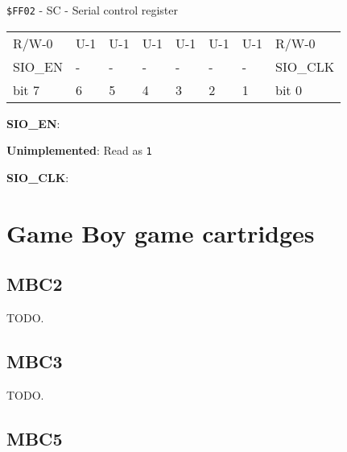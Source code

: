 \documentclass[a4paper, draft, oneside]{memoir}
\begin{document}
\begin{register}[H]
  \caption{\texttt{\$FF02} - SC - Serial control register}
  {
    \ttfamily
    \begin{tabu} to \textwidth {|X[c]|X[c]|X[c]|X[c]|X[c]|X[c]|X[c]|X[c]|}
      \everyrow{\hline}
      \hline
      R/W-0  & U-1                     & U-1                     & U-1                     & U-1                     & U-1                     & U-1                     & R/W-0   \\
      SIO\_EN &  - &  - &  - &  - &  - &  - & SIO\_CLK \\
      \rowfont{\rmfamily\small}
      bit 7  & 6                       & 5                       & 4                       & 3                       & 2                       & 1                       & bit 0   \\
      \hline
    \end{tabu}
  }

  \begin{description}[leftmargin=5em, style=nextline]
    \item[bit 7]
      \textbf{SIO\_EN}:
    \item[bit 6-1]
      \textbf{Unimplemented}: Read as \texttt{1}
    \item[bit 0]
      \textbf{SIO\_CLK}:
  \end{description}
\end{register}

\part{Game Boy game cartridges}



\chapter{MBC2}

TODO.

\chapter{MBC3}

TODO.

\chapter{MBC5}
\end{document}
